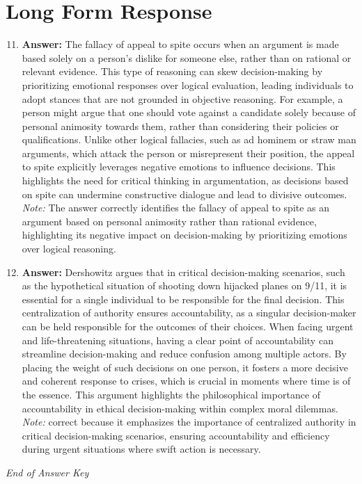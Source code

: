 \documentclass[12pt]{article}
\begin{document}
\section*{Long Form Response}
\begin{enumerate}[label=\arabic*.]
\setcounter{enumi}{10}
\item \textbf{Answer:} The fallacy of appeal to spite occurs when an argument is made based solely on a person's dislike for someone else, rather than on rational or relevant evidence. This type of reasoning can skew decision-making by prioritizing emotional responses over logical evaluation, leading individuals to adopt stances that are not grounded in objective reasoning. For example, a person might argue that one should vote against a candidate solely because of personal animosity towards them, rather than considering their policies or qualifications. Unlike other logical fallacies, such as ad hominem or straw man arguments, which attack the person or misrepresent their position, the appeal to spite explicitly leverages negative emotions to influence decisions. This highlights the need for critical thinking in argumentation, as decisions based on spite can undermine constructive dialogue and lead to divisive outcomes.
\\ \textit{Note:} The answer correctly identifies the fallacy of appeal to spite as an argument based on personal animosity rather than rational evidence, highlighting its negative impact on decision-making by prioritizing emotions over logical reasoning.
\item \textbf{Answer:} Dershowitz argues that in critical decision-making scenarios, such as the hypothetical situation of shooting down hijacked planes on 9/11, it is essential for a single individual to be responsible for the final decision. This centralization of authority ensures accountability, as a singular decision-maker can be held responsible for the outcomes of their choices. When facing urgent and life-threatening situations, having a clear point of accountability can streamline decision-making and reduce confusion among multiple actors. By placing the weight of such decisions on one person, it fosters a more decisive and coherent response to crises, which is crucial in moments where time is of the essence. This argument highlights the philosophical importance of accountability in ethical decision-making within complex moral dilemmas.
\\ \textit{Note:} correct because it emphasizes the importance of centralized authority in critical decision-making scenarios, ensuring accountability and efficiency during urgent situations where swift action is necessary.
\end{enumerate}

\vfill
\noindent\textit{End of Answer Key}
\end{document}
